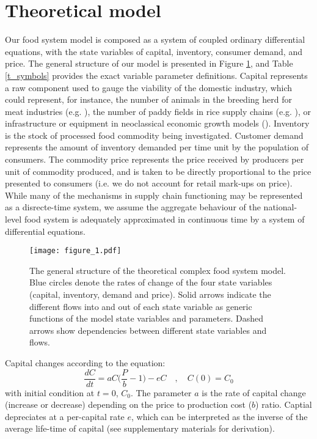 \documentclass[12pt]{article}
\begin{document}
\section{Theoretical model}
Our food system model is composed as a system of coupled ordinary differential equations, with the state variables of capital, inventory, consumer demand, and price. The general structure of our model is presented in Figure \ref{fig_cfs}, and Table \ref{t_symbols} provides the exact variable parameter definitions. Capital represents a raw component used to gauge the viability of the domestic industry, which could represent, for instance, the number of animals in the breeding herd for meat industries (e.g. \cite{meadows1971}), the number of paddy fields in rice supply chains (e.g. \cite{chung2018}), or infrastructure or equipment in neoclassical economic growth models (\cite{ngonghala2017}). Inventory is the stock of processed food commodity being investigated. Customer demand represents the amount of inventory demanded per time unit by the population of consumers. The commodity price represents the price received by producers per unit of commodity produced, and is taken to be directly proportional to the price presented to consumers (i.e. we do not account for retail mark-ups on price). While many of the mechanisms in supply chain functioning may be represented as a disrecte-time system, we assume the aggregate behaviour of the national-level food system is adequately approximated in continuous time by a system of differential equations.

\begin{figure}[t!]
  \centering
  \texttt{[image: figure\_1.pdf]}
  \caption{The general structure of the theoretical complex food system model. Blue circles denote the rates of change of the four state variables (capital, inventory, demand and price). Solid arrows indicate the different flows into and out of each state variable as generic functions of the model state variables and parameters. Dashed arrows show dependencies between different state variables and flows.}
  \label{fig_cfs}
\end{figure}

Capital changes according to the equation:
%
\begin{equation}
  \frac{dC}{dt} = a C \Big(\frac{P}{b} - 1\Big) - e C \quad, \quad C(0) = C_0
  \label{eq_capital}
\end{equation}
%
with initial condition at $t = 0$, $C_0$. The parameter $a$ is the rate of capital change (increase or decrease) depending on the price to production cost ($b$) ratio. Captial depreciates at a per-capital rate $e$, which can be interpreted as the inverse of the average life-time of capital (see supplementary materials for derivation).
\end{document}
